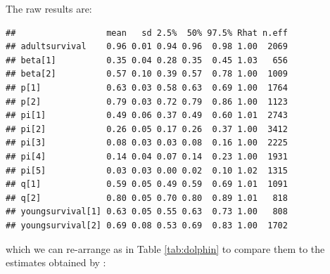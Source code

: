 \documentclass[
  12pt,
]{krantz}
\begin{document}
The raw results are:

\begin{verbatim}
##                  mean   sd 2.5%  50% 97.5% Rhat n.eff
## adultsurvival    0.96 0.01 0.94 0.96  0.98 1.00  2069
## beta[1]          0.35 0.04 0.28 0.35  0.45 1.03   656
## beta[2]          0.57 0.10 0.39 0.57  0.78 1.00  1009
## p[1]             0.63 0.03 0.58 0.63  0.69 1.00  1764
## p[2]             0.79 0.03 0.72 0.79  0.86 1.00  1123
## pi[1]            0.49 0.06 0.37 0.49  0.60 1.01  2743
## pi[2]            0.26 0.05 0.17 0.26  0.37 1.00  3412
## pi[3]            0.08 0.03 0.03 0.08  0.16 1.00  2225
## pi[4]            0.14 0.04 0.07 0.14  0.23 1.00  1931
## pi[5]            0.03 0.03 0.00 0.02  0.10 1.02  1315
## q[1]             0.59 0.05 0.49 0.59  0.69 1.01  1091
## q[2]             0.80 0.05 0.70 0.80  0.89 1.01   818
## youngsurvival[1] 0.63 0.05 0.55 0.63  0.73 1.00   808
## youngsurvival[2] 0.69 0.08 0.53 0.69  0.83 1.00  1702
\end{verbatim}

which we can re-arrange as in Table \ref{tab:dolphin} to compare them to the estimates obtained by \citet{couet2019}:
\end{document}
